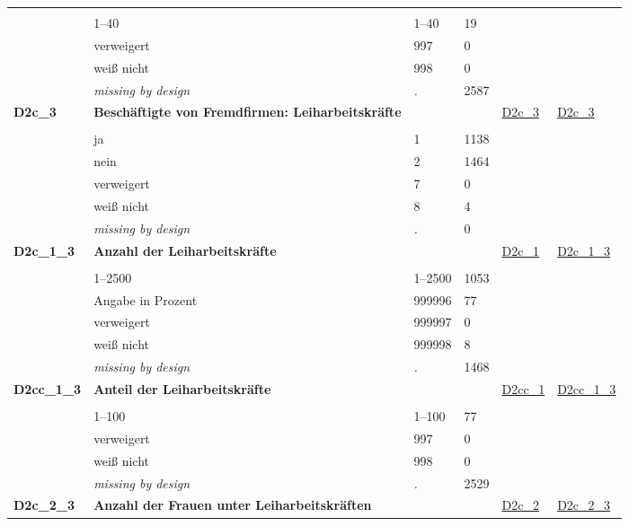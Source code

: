 \begin{longtable}{| L{2.45cm} | L{6cm} | C{1.5cm} | R{1cm} | C{2.25cm} | C{2.25cm} |}
   &  &  &  &  &  \\ 
   & 1--40 & 1--40 & 19 &  &  \\ 
   & verweigert & 997 & 0 &  &  \\ 
   & weiß nicht & 998 & 0 &  &  \\ 
   & \textit{missing by design} & \textit{.} & 2587 &  &  \\ 
   \midrule
\textbf{D2c\_3}\label{var:D2c:3} & \textbf{Beschäftigte von Fremdfirmen: Leiharbeitskräfte} &  &  & \hyperref[D2c:3]{D2c\_3} & \hyperref[var:suf:D2c:3]{D2c\_3} \\ 
   &  &  &  &  &  \\ 
   & ja & 1 & 1138 &  &  \\ 
   & nein & 2 & 1464 &  &  \\ 
   & verweigert & 7 & 0 &  &  \\ 
   & weiß nicht & 8 & 4 &  &  \\ 
   & \textit{missing by design} & \textit{.} & 0 &  &  \\ 
   \midrule
\textbf{D2c\_1\_3}\label{var:D2c:1:3} & \textbf{Anzahl der Leiharbeitskräfte} &  &  & \hyperref[D2c:1]{D2c\_1} & \hyperref[var:suf:D2c:1:3]{D2c\_1\_3} \\ 
   &  &  &  &  &  \\ 
   & 1--2500 & 1--2500 & 1053 &  &  \\ 
   & Angabe in Prozent & 999996 & 77 &  &  \\ 
   & verweigert & 999997 & 0 &  &  \\ 
   & weiß nicht & 999998 & 8 &  &  \\ 
   & \textit{missing by design} & \textit{.} & 1468 &  &  \\ 
   \midrule
\textbf{D2cc\_1\_3}\label{var:D2cc:1:3} & \textbf{Anteil der Leiharbeitskräfte} &  &  & \hyperref[D2cc:1]{D2cc\_1} & \hyperref[var:suf:D2cc:1:3]{D2cc\_1\_3} \\ 
   &  &  &  &  &  \\ 
   & 1--100 & 1--100 & 77 &  &  \\ 
   & verweigert & 997 & 0 &  &  \\ 
   & weiß nicht & 998 & 0 &  &  \\ 
   & \textit{missing by design} & \textit{.} & 2529 &  &  \\ 
   \midrule
\textbf{D2c\_2\_3}\label{var:D2c:2:3} & \textbf{Anzahl der Frauen unter Leiharbeitskräften} &  &  & \hyperref[D2c:2]{D2c\_2} & \hyperref[var:suf:D2c:2:3]{D2c\_2\_3} \\ 

\end{longtable}
